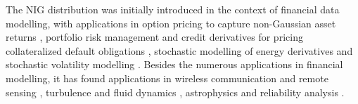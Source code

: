 \documentclass[10pt,a4paper,oneside]{article}
\numberwithin{equation}{section}
\begin{document}
The NIG distribution was initially introduced in the context of financial data modelling, with applications in option pricing to capture non-Gaussian asset returns \cite{Eriksson2009}, portfolio risk management and credit derivatives for pricing collateralized default obligations \cite{Prause1999, Kalemanova2007, Navas-Palencia_thesis2016}, stochastic modelling of energy derivatives \cite{Benth2004} and stochastic volatility modelling \cite{Barndorff1997}. Besides the numerous applications in financial modelling, it has found applications in wireless communication and remote sensing \cite{Hanssen2001, Solbo2004}, turbulence and fluid dynamics \cite{Hedevang2013}, astrophysics \cite{Louarn2024} and reliability analysis \cite{Xu2022}.
%
\end{document}
